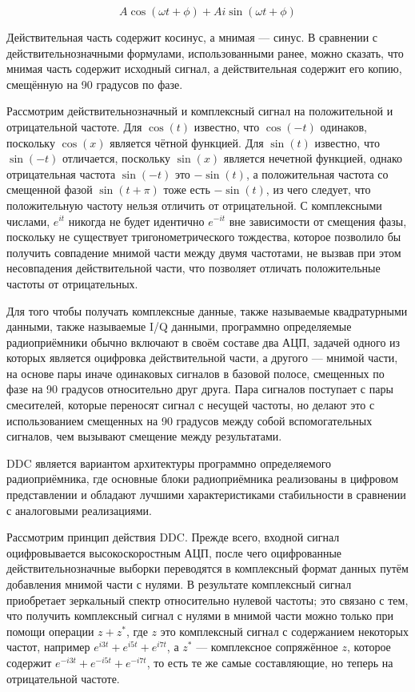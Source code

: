 \documentclass{report}
\begin{document}
$$
A \cos(\omega t + \phi) + A i \sin(\omega t + \phi)
$$

Действительная часть содержит косинус, а мнимая --- синус. В сравнении с действительнозначными формулами, использованными ранее, можно сказать, что мнимая часть содержит исходный сигнал, а действительная содержит его копию, смещённую на 90 градусов по фазе.

Рассмотрим действительнозначный и комплексный сигнал на положительной и отрицательной частоте. Для $\cos(t)$ известно, что $\cos(-t)$ одинаков, поскольку $\cos(x)$ является чётной функцией. Для $\sin(t)$ известно, что $\sin(-t)$ отличается, поскольку $\sin(x)$ является нечетной функцией, однако отрицательная частота $\sin(-t)$ это $-\sin(t)$, а положительная частота со смещенной фазой $\sin(t + \pi)$ тоже есть $-\sin(t)$, из чего следует, что положительную частоту нельзя отличить от отрицательной. С комплексными числами, $e^{it}$ никогда не будет идентично $e^{-it}$ вне зависимости от смещения фазы, поскольку не существует тригонометрического тождества, которое позволило бы получить совпадение мнимой части между двумя частотами, не вызвав при этом несовпадения действительной части, что позволяет отличать положительные частоты от отрицательных.

Для того чтобы получать комплексные данные, также называемые квадратурными данными, также называемые I/Q данными, программно определяемые радиоприёмники обычно включают в своём составе два АЦП, задачей одного из которых является оцифровка действительной части, а другого --- мнимой части, на основе пары иначе одинаковых сигналов в базовой полосе, смещенных по фазе на 90 градусов относительно друг друга. Пара сигналов поступает с пары смесителей, которые переносят сигнал с несущей частоты, но делают это с использованием смещенных на 90 градусов между собой вспомогательных сигналов, чем вызывают смещение между результатами.

DDC является вариантом архитектуры программно определяемого радиоприёмника, где основные блоки радиоприёмника реализованы в цифровом представлении и обладают лучшими характеристиками стабильности в сравнении с аналоговыми реализациями.

Рассмотрим принцип действия DDC. Прежде всего, входной сигнал оцифровывается высокоскоростным АЦП, после чего оцифрованные действительнозначные выборки переводятся в комплексный формат данных путём добавления мнимой части с нулями. В результате комплексный сигнал приобретает зеркальный спектр относительно нулевой частоты; это связано с тем, что получить комплексный сигнал с нулями в мнимой части можно только при помощи операции $z + z^*$, где $z$ это комплексный сигнал с содержанием некоторых частот, например $e^{i3t} + e^{i5t} + e^{i7t}$, а $z^*$ --- комплексное сопряжённое $z$, которое содержит $e^{-i3t} + e^{-i5t} + e^{-i7t}$, то есть те же самые составляющие, но теперь на отрицательной частоте.
\end{document}
